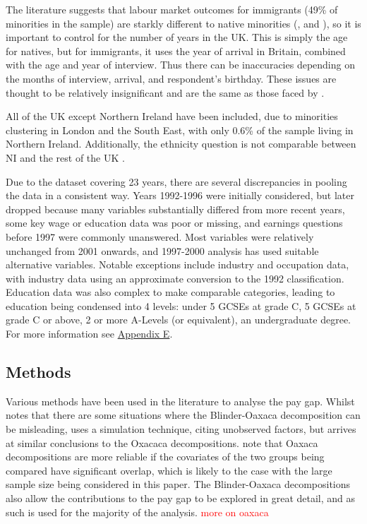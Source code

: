 \documentclass[class=article, crop=false]{standalone}
\begin{document}
The literature suggests that labour market outcomes for immigrants (49\% of minorities in the sample) are starkly different to native minorities (\citet{Brynin}, \citet{ONSe} and \citet{Shields}), so it is important to control for the number of years in the UK. This is simply the age for natives, but for immigrants, it uses the year of arrival in Britain, combined with the age and year of interview. Thus there can be inaccuracies depending on the months of interview, arrival, and respondent’s birthday. These issues are thought to be relatively insignificant and are the same as those faced by \citet{Berthoud}.

All of the UK except Northern Ireland have been included, due to minorities clustering in London and the South East, with only 0.6\% of the sample living in Northern Ireland. Additionally, the ethnicity question is not comparable between NI and the rest of the UK \citep{Longhi}.

Due to the dataset covering 23 years, there are several discrepancies in pooling the data in a consistent way. Years 1992-1996 were initially considered, but later dropped because many variables substantially differed from more recent years, some key wage or education data was poor or missing, and earnings questions before 1997 were commonly unanswered. Most variables were relatively unchanged from 2001 onwards, and 1997-2000 analysis has used suitable alternative variables. Notable exceptions include industry and occupation data, with industry data using an approximate conversion to the 1992 classification. Education data was also complex to make comparable categories, leading to education being condensed into 4 levels: under 5 GCSEs at grade C, 5 GCSEs at grade C or above, 2 or more A-Levels (or equivalent), an undergraduate degree. For more information see \hyperref[sec:appendixE]{Appendix E}.

\subsection{Methods}
\label{sec:Methods}
Various methods have been used in the literature to analyse the pay gap. Whilst \citet{Barsky} notes that there are some situations where the Blinder-Oaxaca decomposition can be misleading, \citet{Olsen} uses a simulation technique, citing unobserved factors, but arrives at similar conclusions to the Oxacaca decompositions. \citet{Longhi} note that Oaxaca decompositions are more reliable if the covariates of the two groups being compared have significant overlap, which is likely to the case with the large sample size being considered in this paper. The Blinder-Oaxaca decompositions also allow the contributions to the pay gap to be explored in great detail, and as such is used for the majority of the analysis. \textcolor{red}{more on oaxaca}
\end{document}
